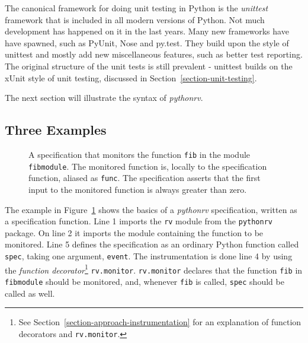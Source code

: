 \documentclass[a4paper,11pt]{kth-mag}
\begin{document}
The canonical framework for doing unit testing in Python is the
\textit{unittest} framework that is included in all modern versions of Python.
Not much development has happened on it in the last years. Many new frameworks
have have spawned, such as PyUnit, Nose and py.test. They build upon the style
of unittest and mostly add new miscellaneous features, such as better test
reporting. The original structure of the unit tests is still prevalent -
unittest builds on the xUnit style of unit testing, discussed in
Section~\ref{section-unit-testing}.

The next section will illustrate the syntax of \textit{pythonrv}.


\subsection{Three Examples}
\lstset{language=Python,numbers=left}

\begin{figure}[h!]
	\begin{center}
	\begin{minipage}{0.7\textwidth}
	
	\end{minipage}
	\end{center}

	\caption{A specification that monitors the function \texttt{fib} in the
	module \texttt{fibmodule}. The monitored function is, locally to the
specification function, aliased as \texttt{func}. The specification asserts
that the first input to the monitored function is always greater than zero.}
	\label{figure-syntax-example-1}
\end{figure}

The example in Figure~\ref{figure-syntax-example-1} shows the basics of a
\textit{pythonrv} specification, written as a specification function. Line 1
imports the \texttt{rv} module from the \texttt{pythonrv} package. On line 2 it
imports the module containing the function to be monitored. Line 5 defines
the specification as an ordinary Python function called \texttt{spec}, taking
one argument, \texttt{event}. The instrumentation is done line 4 by using the
\textit{function decorator}\footnote{See
Section~\ref{section-approach-instrumentation} for an explanation of function
decorators and \texttt{rv.monitor}.} \texttt{rv.monitor}. \texttt{rv.monitor}
declares that the function \texttt{fib} in \texttt{fibmodule} should be
monitored, and, whenever \texttt{fib} is called, \texttt{spec} should be called
as well.
\end{document}
